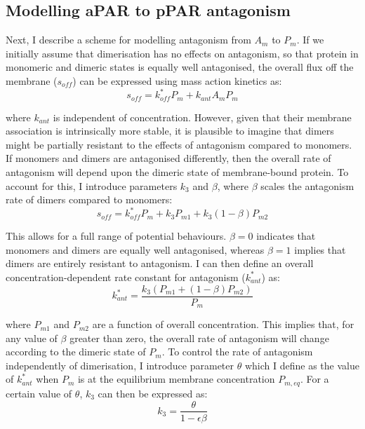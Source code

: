 \documentclass[12pt]{"report"}
\begin{document}
\subsection{Modelling aPAR to pPAR antagonism}

Next, I describe a scheme for modelling antagonism from $A_m$ to $P_m$. If we initially assume that dimerisation has no effects on antagonism, so that protein in monomeric and dimeric states is equally well antagonised, the overall flux off the membrane ($s_{off}$) can be expressed using mass action kinetics as:
\begin{equation}
s_{off} = k_{off}^* P_m + k_{ant} A_m P_m
\end{equation} 

where $k_{ant}$ is independent of concentration. However, given that their membrane association is intrinsically more stable, it is plausible to imagine that dimers might be partially resistant to the effects of antagonism compared to monomers. If monomers and dimers are antagonised differently, then the overall rate of antagonism will depend upon the dimeric state of membrane-bound protein. To account for this, I introduce parameters $k_3$ and $\beta$, where $\beta$ scales the antagonism rate of dimers compared to monomers:
\begin{equation}
s_{off} = k_{off}^* P_m + k_3 P_{m1} + k_3 (1 - \beta) P_{m2}
\end{equation}

This allows for a full range of potential behaviours. $\beta = 0$ indicates that monomers and dimers are equally well antagonised, whereas $\beta = 1$ implies that dimers are entirely resistant to antagonism. I can then define an overall concentration-dependent rate constant for antagonism ($k_{ant}^*$) as:
\begin{equation}
k_{ant}^* = \frac{k_3 (P_{m1} + (1 - \beta) P_{m2})}{P_{m}}
\end{equation} 

where $P_{m1}$ and $P_{m2}$ are a function of overall concentration. This implies that, for any value of $\beta$ greater than zero, the overall rate of antagonism will change according to the dimeric state of $P_m$. To control the rate of antagonism independently of dimerisation, I introduce parameter $\theta$ which I define as the value of $k_{ant}^*$ when $P_m$ is at the equilibrium membrane concentration $P_{m,eq}$. For a certain value of $\theta$, $k_3$ can then be expressed as:
\begin{equation}
k_3 = \frac{\theta}{1 - \epsilon\beta}
\end{equation}
\end{document}
